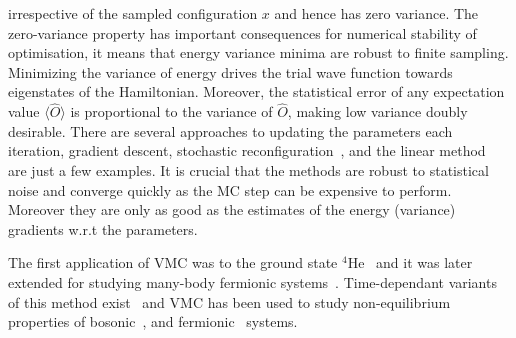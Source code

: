irrespective of the sampled configuration $x$ and hence has zero variance. The zero-variance property has important consequences for numerical stability of optimisation, it means that energy variance minima are robust to finite sampling. Minimizing the variance of energy drives the trial wave function towards eigenstates of the Hamiltonian. Moreover, the statistical error of any expectation value $\langle \hat{O} \rangle$ is proportional to the variance of $\hat{O}$, making low variance doubly desirable. There are several approaches to updating the parameters each iteration, gradient descent, stochastic reconfiguration~\cite{sorella1998green}, and the linear method~\cite{nightingale2001optimization} are just a few examples. It is crucial that the methods are robust to statistical noise and converge quickly as the MC step can be expensive to perform. Moreover they are only as good as the estimates of the energy (variance) gradients w.r.t the parameters.

The first application of VMC was to the ground state ${}^4$He~\cite{mcmillan1965ground} and it was later extended for studying many-body fermionic systems~\cite{ceperley1977monte}. Time-dependant variants of this method exist~\cite{becca2017quantum} and VMC has been used to study non-equilibrium properties of bosonic~\cite{carleo2012localization, carleo2014light}, and fermionic~\cite{ido2015time} systems.


